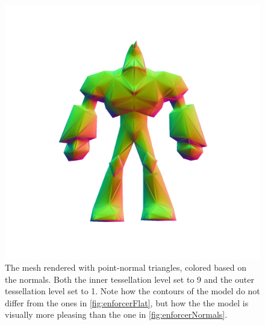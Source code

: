 \documentclass[a4paper,10pt]{article}
\begin{document}
\begin{figure}
	\includegraphics[width=\textwidth]{enforcer_normals_pn_i9_o1.png}
	\caption{The mesh rendered with point-normal triangles, colored based on the normals. Both the inner tessellation level set to 9 and the outer tessellation level set to 1. Note how the contours of the model do not differ from the ones in \cref{fig:enforcerFlat}, but how the the model is visually more pleasing than the one in \cref{fig:enforcerNormals}.}	
\end{figure}
\end{document}
